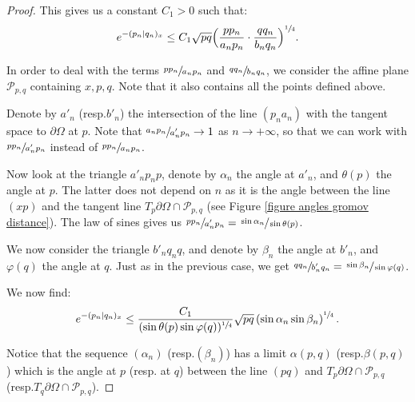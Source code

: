 \documentclass[11pt]{article}
\newcommand{\resp}{resp.\xspace}
\numberwithin{equation}{section}
\theoremstyle{definition}
\let\p\varphi
\begin{document}
\begin{proof}
This gives us a constant $C_1>0$ such that:
\[ e^{-(p_n\vert q_n)_x} \leq C_1 \sqrt{pq} \Bigl( \frac{pp_n}{a_np_n}\cdot \frac{qq_n}{b_nq_n}\Bigr)^{\sfrac{1}{4}}. \]

In order to deal with the terms $\sfrac{pp_n}{a_np_n}$ and $\sfrac{qq_n}{b_nq_n}$, we consider the affine plane $\mathcal P_{p,q}$ containing $x,p,q$. Note that it also contains all the points defined above.

Denote by $a'_n$ (\resp $b'_n$) the intersection of the line $(p_na_n)$ with the tangent space to $\partial \Omega$ at $p$. Note that $\sfrac{a_np_n}{a'_np_n}\to 1$ as $n\to +\infty$, so that we can work with $\sfrac{pp_n}{a'_np_n}$ instead of $\sfrac{pp_n}{a_np_n}$.

Now look at the triangle $a'_np_np$, denote by $\alpha_n$ the angle at $a'_n$, and $\theta(p)$ the angle at $p$. The latter does not depend on $n$ as it is the angle between the line $(xp)$ and the tangent line $T_p\partial\Omega \cap \mathcal P_{p,q}$ (see Figure \ref{figure angles gromov distance}). The law of sines gives us $\sfrac{pp_n}{a'_np_n}=\sfrac{\sin \alpha_n}{\sin \theta(p)}$.

We now consider the triangle $b'_nq_nq$, and denote by $\beta_n$ the angle at $b'_n$, and $\p(q)$ the angle at $q$. Just as in the previous case, we get $\sfrac{qq_n}{b'_nq_n}=\sfrac{\sin \beta_n}{\sin\p(q)}$.

We now find:
\[ e^{-(p_n\vert q_n)_x} \leq \frac{C_1}{(\sin \theta(p) \sin \p(q))^{\sfrac{1}{4}}} \sqrt{pq} \left( \sin \alpha_n \sin \beta_n \right)^{\sfrac{1}{4}}. \]

Notice that the sequence $(\alpha_n)$ (\resp $(\beta_n)$) has a limit $\alpha(p,q)$ (\resp $\beta(p,q)$) which is the angle at $p$ (\resp at $q$) between the line $(pq)$ and $T_p\partial\Omega \cap \mathcal P_{p,q}$ (\resp $T_q\partial\Omega \cap \mathcal P_{p,q}$).


\end{proof}
\end{document}
